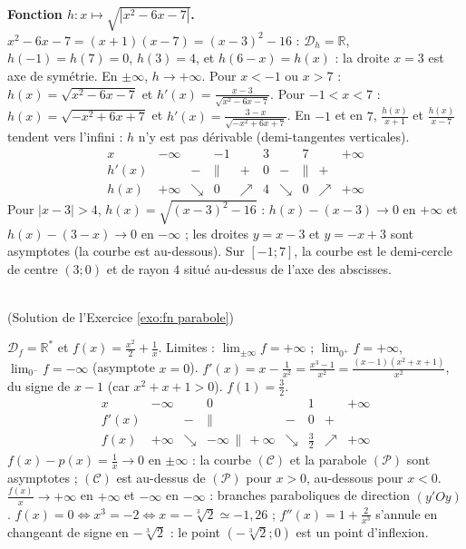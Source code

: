 \begin{corrige}
\begin{sol}
\textbf{Fonction $h : x \mapsto \sqrt{|x^2 - 6x - 7|}$.}
$x^2 - 6x - 7 = (x+1)(x-7) = (x-3)^2 - 16$ : $\mathcal{D}_h = \mathbb{R}$, $h(-1) = h(7) = 0$, $h(3) = 4$, et
$h(6 - x) = h(x)$ : la droite $x = 3$ est axe de sym\'etrie. En $\pm\infty$, $h \to +\infty$.
Pour $x < -1$ ou $x > 7$ : $h(x) = \sqrt{x^2-6x-7}$ et $h'(x) = \frac{x-3}{\sqrt{x^2-6x-7}}$.
Pour $-1 < x < 7$ : $h(x) = \sqrt{-x^2+6x+7}$ et $h'(x) = \frac{3 - x}{\sqrt{-x^2+6x+7}}$.
En $-1$ et en $7$, $\frac{h(x)}{x+1}$ et $\frac{h(x)}{x - 7}$ tendent vers l'infini : $h$ n'y est pas d\'erivable (demi-tangentes verticales).
\[
\begin{array}{c|ccccccccc}
x & -\infty & & -1 & & 3 & & 7 & & +\infty \\ \hline
h'(x) & & - & \| & + & 0 & - & \| & + & \\ \hline
h(x) & +\infty & \searrow & 0 & \nearrow & 4 & \searrow & 0 & \nearrow & +\infty
\end{array}
\]
Pour $|x - 3| > 4$, $h(x) = \sqrt{(x-3)^2 - 16}$ : $h(x) - (x - 3) \to 0$ en $+\infty$ et $h(x) - (3 - x) \to 0$ en $-\infty$ ;
les droites $y = x - 3$ et $y = -x + 3$ sont asymptotes (la courbe est au-dessous). Sur $[-1;7]$, la courbe est le demi-cercle
de centre $(3;0)$ et de rayon $4$ situ\'e au-dessus de l'axe des abscisses.
\end{sol}

\begin{sol} ~ \\
(Solution de l'Exercice \ref{exo:fn parabole})

$\mathcal{D}_f = \mathbb{R}^*$ et $f(x) = \frac{x^2}{2} + \frac{1}{x}$.
Limites : $\lim_{\pm\infty} f = +\infty$ ; $\lim_{0^+} f = +\infty$, $\lim_{0^-} f = -\infty$ (asymptote $x = 0$).
$f'(x) = x - \frac{1}{x^2} = \frac{x^3 - 1}{x^2} = \frac{(x-1)(x^2+x+1)}{x^2}$, du signe de $x - 1$ (car $x^2 + x + 1 > 0$). $f(1) = \frac{3}{2}$.
\[
\begin{array}{c|ccccccc}
x & -\infty & & 0 & & 1 & & +\infty \\ \hline
f'(x) & & - & \| & - & 0 & + & \\ \hline
f(x) & +\infty & \searrow & -\infty \, \| \, +\infty & \searrow & \frac{3}{2} & \nearrow & +\infty
\end{array}
\]
$f(x) - p(x) = \frac{1}{x} \to 0$ en $\pm\infty$ : la courbe $(\mathscr{C})$ et la parabole $(\mathscr{P})$ sont asymptotes ;
$(\mathscr{C})$ est au-dessus de $(\mathscr{P})$ pour $x > 0$, au-dessous pour $x < 0$.
$\frac{f(x)}{x} \to +\infty$ en $+\infty$ et $-\infty$ en $-\infty$ : branches paraboliques de direction $(y'Oy)$.
$f(x) = 0 \iff x^3 = -2 \iff x = -\sqrt[3]{2} \simeq -1{,}26$ ; $f''(x) = 1 + \frac{2}{x^3}$ s'annule en changeant de signe en $-\sqrt[3]{2}$ :
le point $\left(-\sqrt[3]{2} ; 0\right)$ est un point d'inflexion.
\end{sol}


\end{corrige}

